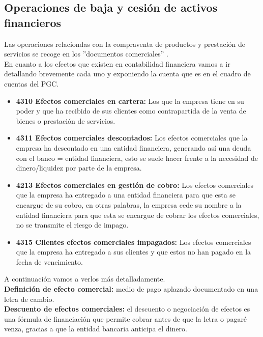 \documentclass[a4paper,12pt]{article}
\begin{document}
\subsection{Operaciones de baja y cesión de activos financieros}

Las operaciones relaciondas con la compraventa de productos y prestación de servicios se recoge en los ''documentos comerciales'' .\\

En cuanto a los efectos que existen en contabilidad financiera vamos a ir detallando brevemente cada uno y exponiendo la cuenta que es en el cuadro de cuentas del PGC.\\
\begin{itemize}
    \item \textbf{4310 Efectos comerciales en cartera:} Los que la empresa tiene en su poder y que ha recibido de sus clientes como contrapartida de la venta de bienes o prestación de servicios.
    \item \textbf{4311 Efectos comerciales descontados:} Los efectos comerciales que la empresa ha descontado en una entidad financiera, generando así una deuda con el banco = entidad financiera, esto se suele hacer frente a la necesidad de dinero/liquidez por parte de la empresa.
    \item \textbf{4213 Efectos comerciales en gestión de cobro:} Los efectos comerciales que la empresa ha entregado a una entidad financiera para que esta se encargue de su cobro, en otras palabras, la empresa cede su nombre a la entidad financiera para que esta se encargue de cobrar los efectos comerciales, no se transmite el riesgo de impago.
    \item \textbf{4315 Clientes efectos comerciales impagados: } Los efectos comerciales que la empresa ha entregado a sus clientes y que estos no han pagado en la fecha de vencimiento.
\end{itemize}

A continuación vamos a verlos más detalladamente.\\

\textbf{Definición de efecto comercial:} medio de pago aplazado documentado en una letra de cambio.\\

\textbf{Descuento de efectos comerciales:} el descuento o negociación de efectos es una fórmula de financiación que permite cobrar antes de que la letra o pagaré venza, gracias a que la entidad bancaria anticipa el dinero.\\
\end{document}
